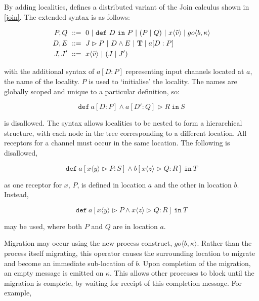 By adding localities, \cite*{djoin} defines a distributed variant of the
Join calculus shown in \ref{join}.  The extended syntax is as follows:

\begin{align}
\label{djoinsyntax}
  P, Q\ & ::=\ 
  0\ |\ 
  \mathtt{def}\ D\ \mathtt{in}\ P\ |\
  (P\;|\;Q)\ |\ 
  x\langle \tilde{v} \rangle \pc
  go \langle b, \kappa \rangle \\
  D, E\ & ::=\
  J \rhd P\ |\
  D \wedge E\ |\ 
  \mathbf{T} \pc 
 a[D : P]
 \\
  J,J^\prime\ & ::=\ 
  x\langle \tilde{v} \rangle\ |\
  (J\;|\;J^\prime)
\end{align}

\noindent with the additional syntax of $a[D : P]$ representing input
channels located at $a$, the name of the locality. $P$ is used to
`initialise' the locality.  The names are globally scoped and unique
to a particular definition, so:

\begin{equation}
\mathtt{def}\ a[D:P] \wedge a[D':Q] \rhd R\ \mathtt{in}\ S
\end{equation}

\noindent is disallowed.  The syntax allows localities to be nested to
form a hierarchical structure, with each node in the tree
corresponding to a different location.  All receptors for a channel
must occur in the same location.  The following is disallowed,

\begin{equation}
  \mathtt{def}\ a[x \langle y \rangle \rhd P : S] \wedge b[x \langle z \rangle \rhd Q : R]\ \mathtt{in}\ T
\end{equation}

\noindent as one receptor for $x$, $P$, is defined in location $a$ and
the other in location $b$.  Instead, 

\begin{equation}
  \mathtt{def}\ a[x \langle y \rangle \rhd P \wedge x \langle z \rangle \rhd Q : R]\ \mathtt{in}\ T
\end{equation}

\noindent may be used, where both $P$ and $Q$ are in location $a$.

Migration may occur using the new process construct, $go \langle b,
\kappa \rangle$.  Rather than the process itself migrating, this
operator causes the surrounding location to migrate and become an
immediate sub-location of $b$.  Upon completion of the migration, an
empty message is emitted on $\kappa$.  This allows other processes to
block until the migration is complete, by waiting for receipt of this
completion message.  For example,

